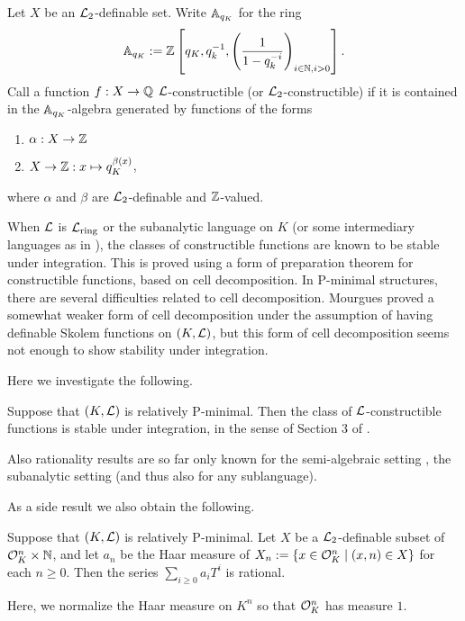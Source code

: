 \begin{defn}
Let $X$ be an $\cL_2$-definable set. Write $\AA_{q_K}$ for the ring \[\AA_{q_K}:=\ZZ\left[q_K, q_k^{-1}, \left(\frac1{1-q_k^{-i}}\right)_{i\in \NN, i>0}\right].\]
Call a function $f:X\to \QQ$ $\cL$-constructible (or $\cL_2$-constructible) if it is contained in the $\AA_{q_K}$-algebra generated by functions of the forms
\begin{enumerate}
\item $\alpha:X\to \ZZ$
\item $X\to \ZZ:x\mapsto q_K^{\beta(x)}$,
\end{enumerate}
where $\alpha$ and $\beta$ are $\cL_2$-definable and $\ZZ$-valued. 
\end{defn}


When $\cL$ is $\cL_{\rm ring}$ or the subanalytic language on $K$ (or some intermediary languages as in \cite{CLip}), the classes of constructible functions are known to be stable under integration. This is proved using a form of preparation theorem for constructible functions, based on cell decomposition. In P-minimal structures, there are several difficulties related to cell decomposition. Mourgues \cite{mou-09} proved a somewhat weaker form of cell decomposition under the assumption of having definable Skolem functions on $(K,\cL)$, but this form of cell decomposition seems not enough to show stability under integration.

Here we investigate the following.

\begin{thm}\label{thm1}
Suppose that $(K,\cL)$ is relatively P-minimal. Then the class of $\cL$-constructible functions is stable under integration, in the sense of Section 3 of \cite{Clu-Gor-Hal-14}.
\end{thm}

Also rationality results are so far only known for the semi-algebraic setting \cite{denef-84}, the subanalytic setting \cite{denef-vdd-88} (and thus also for any sublanguage).

As a side result we also obtain the following.

\begin{thm}\label{thm:rationality}
Suppose that $(K,\cL)$ is relatively P-minimal. Let $X$ be a $\cL_2$-definable subset of $\cO_K^n\times \NN$, and let $a_n$ be the Haar measure of $X_n:=\{x\in \cO_K^n\mid (x,n)\in X\}$ for each $n\geq 0$. Then the series $\sum_{i\geq 0} a_i T^i$ is rational. 
\end{thm}
Here, we normalize the Haar measure on $K^n$ so that $\cO_K^n$ has measure $1$. 


